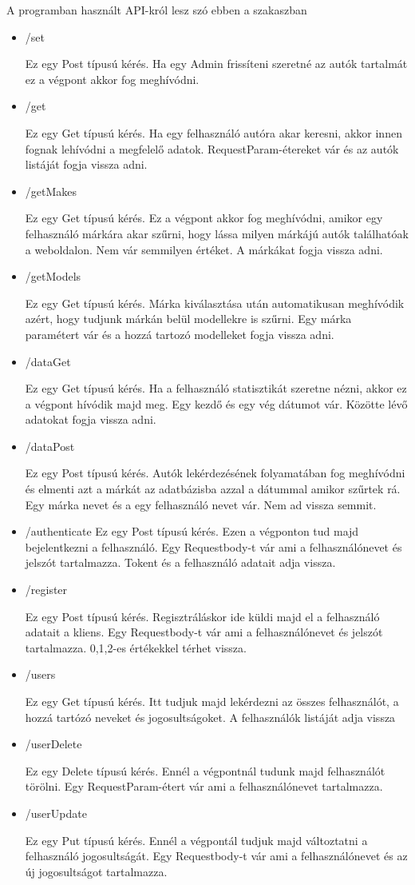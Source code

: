  
A programban használt API-król lesz szó ebben a szakaszban
\begin{itemize}
\item /set

Ez egy Post típusú kérés. Ha egy Admin frissíteni szeretné az autók tartalmát ez a végpont akkor fog meghívódni.
\item /get

Ez egy Get típusú kérés. Ha egy felhasználó autóra akar keresni, akkor innen fognak lehívódni a megfelelő adatok.
RequestParam-étereket vár és az autók listáját fogja vissza adni.
\item /getMakes

Ez egy Get típusú kérés. Ez a végpont akkor fog meghívódni, amikor egy felhasználó márkára akar szűrni, hogy lássa milyen márkájú autók találhatóak a weboldalon.
Nem vár semmilyen értéket. A márkákat fogja vissza adni.
\item /getModels

Ez egy Get típusú kérés. Márka kiválasztása után automatikusan meghívódik azért, hogy tudjunk márkán belül modellekre is szűrni.
Egy márka paramétert vár és a hozzá tartozó modelleket fogja vissza adni.
\item /dataGet

Ez egy Get típusú kérés. Ha a felhasználó statisztikát szeretne nézni, akkor ez a végpont hívódik majd meg.
Egy kezdő és egy vég dátumot vár. Közötte lévő adatokat fogja vissza adni.
\item /dataPost

Ez egy Post típusú kérés. Autók lekérdezésének folyamatában fog meghívódni és elmenti azt a márkát az adatbázisba azzal a dátummal amikor szűrtek rá.
Egy márka nevet és a egy felhasználó nevet vár. Nem ad vissza semmit.
\item /authenticate
Ez egy Post típusú kérés. Ezen a végponton tud majd bejelentkezni a felhasználó.
Egy Requestbody-t vár ami a felhasználónevet és jelszót tartalmazza. Tokent és a felhasználó adatait adja vissza.
\item /register

Ez egy Post típusú kérés. Regisztráláskor ide küldi majd el a felhasználó adatait a kliens.
Egy Requestbody-t vár ami a felhasználónevet és jelszót tartalmazza. 0,1,2-es értékekkel térhet vissza.
\item /users

Ez egy Get típusú kérés. Itt tudjuk majd lekérdezni az összes felhasználót, a hozzá tartózó neveket és jogosultságoket.
A felhasználók listáját adja vissza
\item /userDelete

Ez egy Delete típusú kérés. Ennél a végpontnál tudunk majd felhasználót törölni.
Egy RequestParam-étert vár ami a felhasználónevet tartalmazza.
\item /userUpdate

Ez egy Put típusú kérés. Ennél  a végpontál tudjuk majd változtatni a felhasználó jogosultságát.
Egy Requestbody-t vár ami a felhasználónevet és az új jogosultságot tartalmazza.

\end{itemize}









